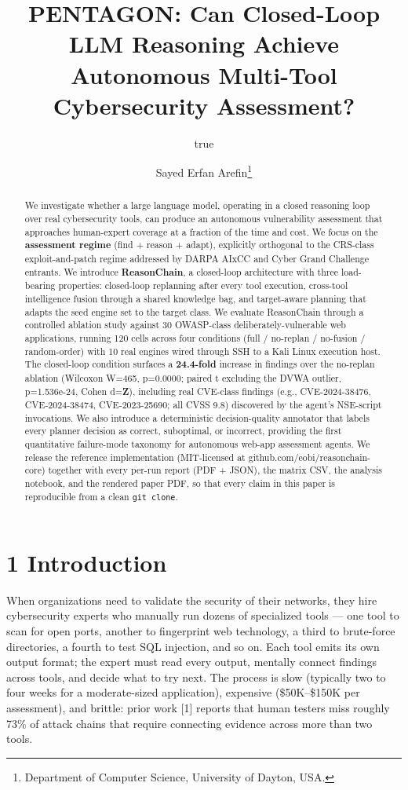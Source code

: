 \documentclass[
]{article}
\title{PENTAGON: Can Closed-Loop LLM Reasoning Achieve Autonomous
Multi-Tool Cybersecurity Assessment?}
\author{true \and Sayed Erfan Arefin\footnote{Department of Computer
  Science, University of Dayton, USA.}}
\date{}
\begin{document}
\maketitle
\begin{abstract}
We investigate whether a large language model, operating in a closed
reasoning loop over real cybersecurity tools, can produce an autonomous
vulnerability assessment that approaches human-expert coverage at a
fraction of the time and cost. We focus on the \textbf{assessment
regime} (find + reason + adapt), explicitly orthogonal to the CRS-class
exploit-and-patch regime addressed by DARPA AIxCC and Cyber Grand
Challenge entrants. We introduce \textbf{ReasonChain}, a closed-loop
architecture with three load-bearing properties: closed-loop replanning
after every tool execution, cross-tool intelligence fusion through a
shared knowledge bag, and target-aware planning that adapts the seed
engine set to the target class. We evaluate ReasonChain through a
controlled ablation study against 30 OWASP-class deliberately-vulnerable
web applications, running 120 cells across four conditions (full /
no-replan / no-fusion / random-order) with 10 real engines wired through
SSH to a Kali Linux execution host. The closed-loop condition surfaces a
\textbf{24.4-fold} increase in findings over the no-replan ablation
(Wilcoxon W=465, p=0.0000; paired t excluding the DVWA outlier,
p=1.536e-24, Cohen d=\textbf{Z}), including real CVE-class findings
(e.g., CVE-2024-38476, CVE-2024-38474, CVE-2023-25690; all CVSS 9.8)
discovered by the agent's NSE-script invocations. We also introduce a
deterministic decision-quality annotator that labels every planner
decision as correct, suboptimal, or incorrect, providing the first
quantitative failure-mode taxonomy for autonomous web-app assessment
agents. We release the reference implementation (MIT-licensed at
github.com/eobi/reasonchain-core) together with every per-run report
(PDF + JSON), the matrix CSV, the analysis notebook, and the rendered
paper PDF, so that every claim in this paper is reproducible from a
clean \texttt{git\ clone}.
\end{abstract}

\section{1 Introduction}\label{introduction}

When organizations need to validate the security of their networks, they
hire cybersecurity experts who manually run dozens of specialized tools
--- one tool to scan for open ports, another to fingerprint web
technology, a third to brute-force directories, a fourth to test SQL
injection, and so on. Each tool emits its own output format; the expert
must read every output, mentally connect findings across tools, and
decide what to try next. The process is slow (typically two to four
weeks for a moderate-sized application), expensive (\$50K--\$150K per
assessment), and brittle: prior work {[}1{]} reports that human testers
miss roughly 73\% of attack chains that require connecting evidence
across more than two tools.
\end{document}
